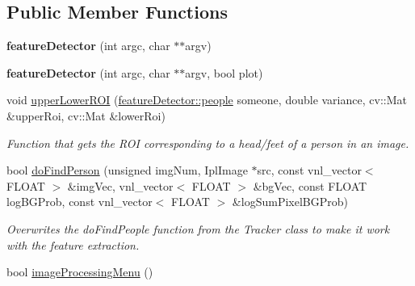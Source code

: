 \subsection*{Public Member Functions}
\begin{DoxyCompactItemize}
\item 
\hypertarget{classfeatureDetector_ac1ae7a446e0a4ef63ae1ff48cb4c3adc}{
{\bfseries featureDetector} (int argc, char $\ast$$\ast$argv)}
\label{classfeatureDetector_ac1ae7a446e0a4ef63ae1ff48cb4c3adc}

\item 
\hypertarget{classfeatureDetector_ac55f74c17c01b19821e1dec3e4a93354}{
{\bfseries featureDetector} (int argc, char $\ast$$\ast$argv, bool plot)}
\label{classfeatureDetector_ac55f74c17c01b19821e1dec3e4a93354}

\item 
\hypertarget{classfeatureDetector_a2927764bbe8e862087bdce685ce0142f}{
void \hyperlink{classfeatureDetector_a2927764bbe8e862087bdce685ce0142f}{upperLowerROI} (\hyperlink{structfeatureDetector_1_1people}{featureDetector::people} someone, double variance, cv::Mat \&upperRoi, cv::Mat \&lowerRoi)}
\label{classfeatureDetector_a2927764bbe8e862087bdce685ce0142f}

\begin{DoxyCompactList}\small\item\em Function that gets the ROI corresponding to a head/feet of a person in an image. \item\end{DoxyCompactList}\item 
\hypertarget{classfeatureDetector_aff38a72b47c051775f82b1567f2388af}{
bool \hyperlink{classfeatureDetector_aff38a72b47c051775f82b1567f2388af}{doFindPerson} (unsigned imgNum, IplImage $\ast$src, const vnl\_\-vector$<$ FLOAT $>$ \&imgVec, vnl\_\-vector$<$ FLOAT $>$ \&bgVec, const FLOAT logBGProb, const vnl\_\-vector$<$ FLOAT $>$ \&logSumPixelBGProb)}
\label{classfeatureDetector_aff38a72b47c051775f82b1567f2388af}

\begin{DoxyCompactList}\small\item\em Overwrites the {\ttfamily doFindPeople} function from the {\ttfamily Tracker} class to make it work with the feature extraction. \item\end{DoxyCompactList}\item 
\hypertarget{classfeatureDetector_a6f2d6a5438138b4a55e49f593bdad57c}{
bool \hyperlink{classfeatureDetector_a6f2d6a5438138b4a55e49f593bdad57c}{imageProcessingMenu} ()}
\label{classfeatureDetector_a6f2d6a5438138b4a55e49f593bdad57c}


\end{DoxyCompactItemize}
